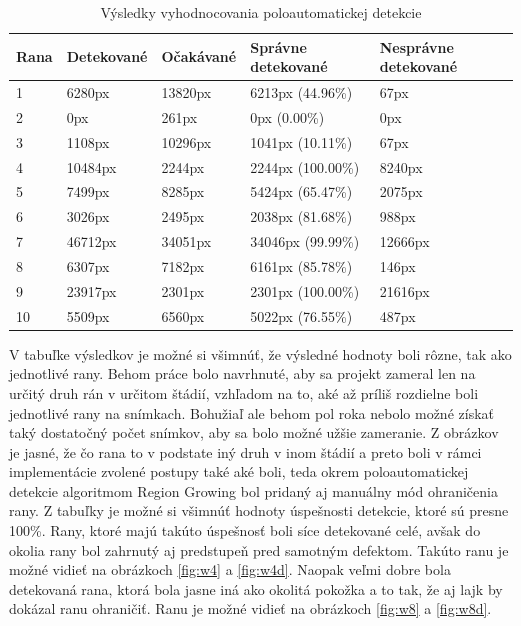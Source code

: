 \begin{table}[h]
\centering
\label{tab:result}
\begin{tabular}{|l|l|l|l|l|}
\hline
Rana & Detekované & Očakávané & Správne detekované & Nesprávne detekované \\ \hline
1    & 6280px               & 13820px           & 6213px (44.96\%)    & 67px         \\ \hline
2    & 0px                  & 261px             & 0px (0.00\%)        & 0px          \\ \hline
3    & 1108px               & 10296px           & 1041px (10.11\%)    & 67px         \\ \hline
4    & 10484px              & 2244px            & 2244px (100.00\%)   & 8240px     \\ \hline
5    & 7499px               & 8285px            & 5424px (65.47\%)    & 2075px      \\ \hline
6    & 3026px               & 2495px            & 2038px (81.68\%)    & 988px       \\ \hline
7    & 46712px              & 34051px           & 34046px (99.99\%)   & 12666px     \\ \hline
8    & 6307px               & 7182px            & 6161px (85.78\%)    & 146px        \\ \hline
9    & 23917px              & 2301px            & 2301px (100.00\%)   & 21616px    \\ \hline
10   & 5509px               & 6560px            & 5022px (76.55\%)    & 487px        \\ \hline
\end{tabular}
\caption{Výsledky vyhodnocovania poloautomatickej detekcie}
\end{table}
V tabuľke výsledkov je možné si všimnúť, že výsledné hodnoty boli rôzne, tak ako jednotlivé rany. Behom práce bolo navrhnuté, aby sa projekt zameral len na určitý druh rán v určitom štádií, vzhľadom na to, aké až príliš rozdielne boli jednotlivé rany na snímkach. Bohužiaľ ale behom pol roka nebolo možné získať taký dostatočný počet snímkov, aby sa bolo možné užšie zameranie. Z obrázkov je jasné, že čo rana to v podstate iný druh v inom štádií a preto boli v rámci implementácie zvolené postupy také aké boli, teda okrem poloautomatickej detekcie algoritmom Region Growing bol pridaný aj manuálny mód ohraničenia rany. Z tabuľky je možné si všimnúť hodnoty úspešnosti detekcie, ktoré sú presne 100\%. Rany, ktoré majú takúto úspešnosť boli síce detekované celé, avšak do okolia rany bol zahrnutý aj predstupeň pred samotným defektom. Takúto ranu je možné vidieť na obrázkoch \ref{fig:w4} a \ref{fig:w4d}. Naopak veľmi dobre bola detekovaná rana, ktorá bola jasne iná ako okolitá pokožka a to tak, že aj lajk by dokázal ranu ohraničiť. Ranu je možné vidieť na obrázkoch \ref{fig:w8} a \ref{fig:w8d}.

